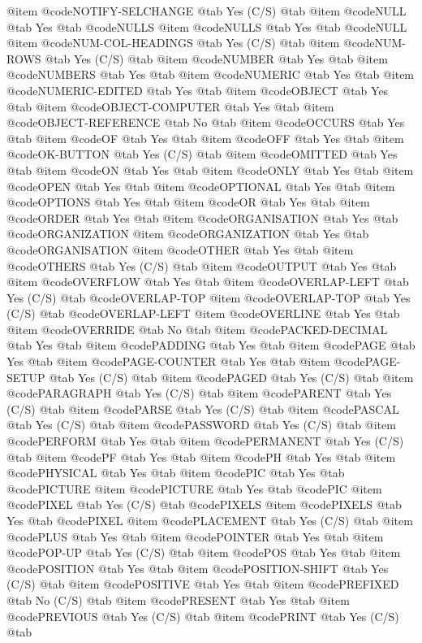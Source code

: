 @item @code{NOTIFY-SELCHANGE} @tab Yes	(C/S) @tab
@item @code{NULL} @tab Yes @tab @code{NULLS}
@item @code{NULLS} @tab Yes @tab @code{NULL}
@item @code{NUM-COL-HEADINGS} @tab Yes	(C/S) @tab
@item @code{NUM-ROWS} @tab Yes	(C/S) @tab
@item @code{NUMBER} @tab Yes @tab
@item @code{NUMBERS} @tab Yes @tab
@item @code{NUMERIC} @tab Yes @tab
@item @code{NUMERIC-EDITED} @tab Yes @tab
@item @code{OBJECT} @tab Yes @tab
@item @code{OBJECT-COMPUTER} @tab Yes @tab
@item @code{OBJECT-REFERENCE} @tab No @tab
@item @code{OCCURS} @tab Yes @tab
@item @code{OF} @tab Yes @tab
@item @code{OFF} @tab Yes @tab
@item @code{OK-BUTTON} @tab Yes	(C/S) @tab
@item @code{OMITTED} @tab Yes @tab
@item @code{ON} @tab Yes @tab
@item @code{ONLY} @tab Yes @tab
@item @code{OPEN} @tab Yes @tab
@item @code{OPTIONAL} @tab Yes @tab
@item @code{OPTIONS} @tab Yes @tab
@item @code{OR} @tab Yes @tab
@item @code{ORDER} @tab Yes @tab
@item @code{ORGANISATION} @tab Yes @tab @code{ORGANIZATION}
@item @code{ORGANIZATION} @tab Yes @tab @code{ORGANISATION}
@item @code{OTHER} @tab Yes @tab
@item @code{OTHERS} @tab Yes	(C/S) @tab
@item @code{OUTPUT} @tab Yes @tab
@item @code{OVERFLOW} @tab Yes @tab
@item @code{OVERLAP-LEFT} @tab Yes	(C/S) @tab @code{OVERLAP-TOP}
@item @code{OVERLAP-TOP} @tab Yes	(C/S) @tab @code{OVERLAP-LEFT}
@item @code{OVERLINE} @tab Yes @tab
@item @code{OVERRIDE} @tab No @tab
@item @code{PACKED-DECIMAL} @tab Yes @tab
@item @code{PADDING} @tab Yes @tab
@item @code{PAGE} @tab Yes @tab
@item @code{PAGE-COUNTER} @tab Yes @tab
@item @code{PAGE-SETUP} @tab Yes	(C/S) @tab
@item @code{PAGED} @tab Yes	(C/S) @tab
@item @code{PARAGRAPH} @tab Yes	(C/S) @tab
@item @code{PARENT} @tab Yes	(C/S) @tab
@item @code{PARSE} @tab Yes	(C/S) @tab
@item @code{PASCAL} @tab Yes	(C/S) @tab
@item @code{PASSWORD} @tab Yes	(C/S) @tab
@item @code{PERFORM} @tab Yes @tab
@item @code{PERMANENT} @tab Yes	(C/S) @tab
@item @code{PF} @tab Yes @tab
@item @code{PH} @tab Yes @tab
@item @code{PHYSICAL} @tab Yes @tab
@item @code{PIC} @tab Yes @tab @code{PICTURE}
@item @code{PICTURE} @tab Yes @tab @code{PIC}
@item @code{PIXEL} @tab Yes	(C/S) @tab @code{PIXELS}
@item @code{PIXELS} @tab Yes @tab @code{PIXEL}
@item @code{PLACEMENT} @tab Yes	(C/S) @tab
@item @code{PLUS} @tab Yes @tab
@item @code{POINTER} @tab Yes @tab
@item @code{POP-UP} @tab Yes	(C/S) @tab
@item @code{POS} @tab Yes @tab
@item @code{POSITION} @tab Yes @tab
@item @code{POSITION-SHIFT} @tab Yes	(C/S) @tab
@item @code{POSITIVE} @tab Yes @tab
@item @code{PREFIXED} @tab No	(C/S) @tab
@item @code{PRESENT} @tab Yes @tab
@item @code{PREVIOUS} @tab Yes	(C/S) @tab
@item @code{PRINT} @tab Yes	(C/S) @tab
